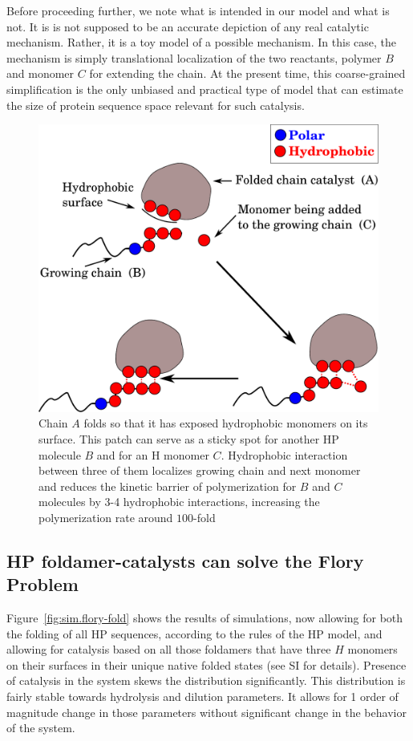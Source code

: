 \documentclass[journal=jacsat,manuscript=article,layout=twocolumn]{achemso}
\begin{document}
Before proceeding further, we note what is intended in our model and what is not.  It is is not 
supposed to be an accurate depiction of any real catalytic mechanism.  Rather, it is a toy 
model of a possible mechanism.  In this case, the mechanism is simply translational 
localization of the two reactants, polymer $B$ and monomer $C$ for extending the chain.  At the 
present time, this coarse-grained simplification is the only unbiased and practical type of model 
that can estimate the size of protein sequence space relevant for such catalysis.
\begin{figure}[h!]
  \centering
  \includegraphics[width=0.9\columnwidth]{pictures/hp-catalysis.pdf} 
  \caption{Chain $A$ folds so that it has exposed hydrophobic monomers on its surface.  This patch 
can serve as a sticky spot for another HP molecule $B$ and for an H monomer $C$.  Hydrophobic 
interaction between three of them localizes growing chain and next monomer and reduces the kinetic 
barrier of polymerization for $B$ and $C$ molecules by 3-4 hydrophobic interactions, increasing the 
polymerization rate around $ 100$-fold }
  \label{fig:hp-catalysis}
\end{figure}


\subsection{HP foldamer-catalysts can solve the Flory Problem}

Figure~\ref{fig:sim.flory-fold} shows the results of simulations, now allowing for both the 
folding of all HP sequences, according to the rules of the HP model, and allowing for catalysis 
based on all those foldamers that have three $H$ monomers on their surfaces in their unique native 
folded states (see SI for details). Presence of catalysis in the system skews the distribution 
significantly. This distribution is fairly stable towards hydrolysis and dilution
parameters. It allows for 1 order of magnitude change in those parameters without significant change 
in the behavior of the system.
\end{document}
